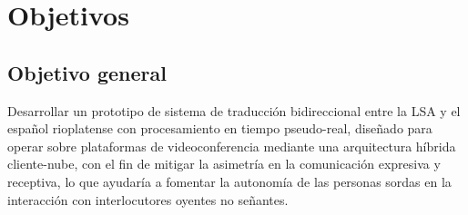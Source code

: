 \chapter{Objetivos}

\section{Objetivo general}
Desarrollar un prototipo de sistema de traducción bidireccional entre la LSA y el español rioplatense con procesamiento en tiempo pseudo-real, diseñado para operar sobre plataformas de videoconferencia mediante una arquitectura híbrida cliente-nube, con el fin de mitigar la asimetría en la comunicación expresiva y receptiva, lo que ayudaría a fomentar la autonomía de las personas sordas en la interacción con interlocutores oyentes no señantes. %

